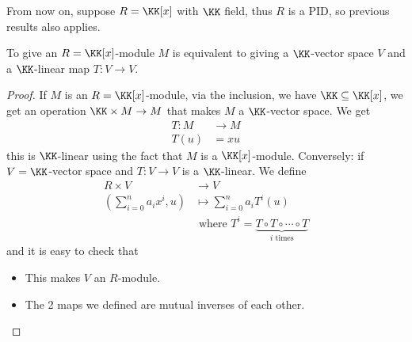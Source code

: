 From now on, suppose \( R = \KK[x] \) with \( \KK \) field, thus \( R \) is a PID, so previous
results also applies.

\begin{proposition}
	\label{prop:module-linear-map}
	To give an \( R=\KK[x] \)-module \( M \) is equivalent to giving a \( \KK \)-vector space \( V \) and a
	\( \KK \)-linear map \( T: V \to V \).
\end{proposition}

\begin{proof}
	If \( M \) is an \( R = \KK[x] \)-module, via the inclusion, we have \( \KK \subseteq \KK[x] \), we get an
	operation \( \KK \times M \to M \) that makes \( M \) a \( \KK \)-vector space. We get
	\[
		\begin{aligned}
			T: M & \to M \\
			T(u) & = xu
		\end{aligned}
	\]
	this is \( \KK \)-linear using the fact that \( M \) is a \( \KK[x] \)-module. Conversely: if \( V= \KK \)-vector space
	and \( T: V \to V \) is a \( \KK \)-linear. We define
	\begin{align*}
		R\times V                 & \to V                                                                             \\
		(\sum_{i=0}^n a_i x^i, u) & \mapsto \sum_{i=0}^n a_i T^i(u)                                                   \\
		                          & \text{ where } T^i = \underbrace{T \circ T \circ \cdots \circ T}_{i\text{ times}}
	\end{align*}
	and it is easy to check that
	\begin{itemize}
		\item This makes \( V \) an \( R \)-module.
		\item The 2 maps we defined are mutual inverses of each other.
	\end{itemize}
\end{proof}

